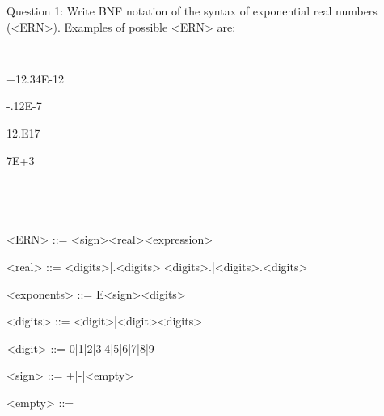 \documentclass{article}
\begin{document}
\rmfamily
Question 1: Write BNF notation of the syntax of exponential real numbers (<ERN>). Examples of possible <ERN> are:

\texttt\

\ttfamily
+12.34E-12

-.12E-7

12.E17

7E+3

\texttt\

\\

\ttfamily

<ERN> ::= <sign><real><expression>

<real> ::= <digits>|.<digits>|<digits>.|<digits>.<digits>

<exponents> ::= E<sign><digits>

<digits> ::= <digit>|<digit><digits>

<digit> ::= 0|1|2|3|4|5|6|7|8|9

<sign> ::= +|-|<empty>

<empty> ::=
\end{document}

